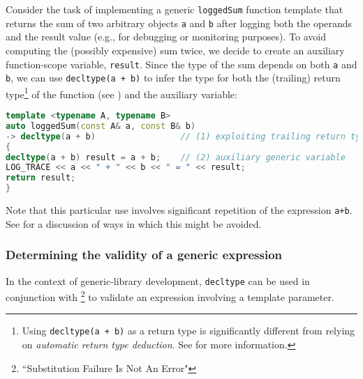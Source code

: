 Consider the task of implementing a generic \lstinline!loggedSum! function
template that returns the sum of two arbitrary objects \lstinline!a! and
\lstinline!b! after logging both the operands and the result value (e.g.,
for debugging or monitoring purposes). To avoid computing the (possibly
expensive) sum twice, we decide to create an auxiliary function-scope
variable, \lstinline!result!. Since the type of the sum depends on both
\lstinline!a! and \lstinline!b!, we can use
\lstinline!decltype(a!~\lstinline!+!~\lstinline!b)! to infer the type for both
the (trailing) return type{\cprotect\footnote{Using
\lstinline!decltype(a!~\lstinline!+!~\lstinline!b)! as a return type is
significantly different from relying on \emph{automatic return type
deduction}. See %
 for more information.}} of the
function (see %
) and the auxiliary variable:

\begin{lstlisting}[language=C++]
template <typename A, typename B>
auto loggedSum(const A& a, const B& b)
-> decltype(a + b)                 // (1) exploiting trailing return types
{
decltype(a + b) result = a + b;    // (2) auxiliary generic variable
LOG_TRACE << a << " + " << b << " = " << result;
return result;
}
\end{lstlisting}
Note that this particular use involves significant repetition of the expression \lstinline!a+b!.  See
for a discussion of ways in which this might be avoided.

\subsubsection[Determining the validity of a generic expression]{Determining the validity of a generic expression}\label{determining-the-validity-of-a-generic-expression}

In the context of generic-library development, \lstinline!decltype! can be
used in conjunction with \footnote{``Substitution Failure Is Not An Error"} to validate an expression involving a
template parameter.

